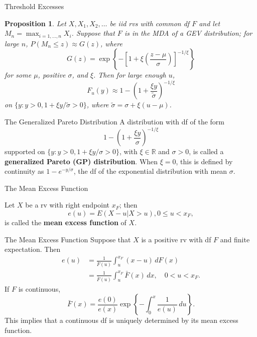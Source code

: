 \documentclass{beamer}
\newtheorem{proposition}{Proposition}
\begin{document}
\begin{frame}{Threshold Excesses}
    \begin{proposition} %
        Let $X, X_1, X_2, \ldots$ be iid rvs with common df $F$ and let $M_n = \max_{i = 1, \ldots, n} X_i$. Suppose that $F$ is in the MDA of a GEV distribution; for large $n$, $P(M_n \le z) \approx G(z)$, where
        \[
        G(z) = \exp\left\{-\left[1 + \xi\left(\frac{z - \mu}{\sigma}\right)\right]^{-1 / \xi}\right\}
        \]
        for some $\mu$, positive $\sigma$, and $\xi$. Then for large enough $u$,
        \[
        F_u(y) \approx 1 - \left(1 + \frac{\xi y}{\tilde{\sigma}}\right)^{-1 / \xi}
        \]
        on $\{y : y > 0, 1 + \xi y / \tilde{\sigma} > 0\}$, where $\tilde{\sigma} = \sigma + \xi(u - \mu)$.
    \end{proposition}
\end{frame}

\begin{frame}{The Generalized Pareto Distribution}
    A distribution with df of the form
    \[
    1 - \left(1 + \frac{\xi y}{\sigma}\right)^{-1 / \xi}
    \]
    supported on $\{y : y > 0, 1 + \xi y / \sigma > 0\}$, with $\xi \in \mathbb{R}$ and $\sigma > 0$, is called a \textbf{generalized Pareto (GP) distribution}. When $\xi = 0$, this is defined by continuity as $1 - e^{-y / \sigma}$, the df of the exponential distribution with mean $\sigma$.
\end{frame}

\begin{frame}{The Mean Excess Function}
    \begin{definition}
        Let $X$ be a rv with right endpoint $x_F$; then
        \[
        e(u) = E(X - u | X > u), 0 \le u < x_F,
        \]
        is called the \textbf{mean excess function} of $X$.
    \end{definition}
\end{frame}

\begin{frame}{The Mean Excess Function}
    Suppose that $X$ is a positive rv with df $F$ and finite expectation. Then
    \begin{align*}
        e(u) &= \frac{1}{\bar{F}(u)}\int_u^{x_F} (x - u)\,dF(x) \\
        &= \frac{1}{\bar{F}(u)}\int_u^{x_F} \bar{F}(x)\,dx, \quad 0 < u < x_F.
    \end{align*}
    If $F$ is continuous,
    \[
    \bar{F}(x) = \frac{e(0)}{e(x)}\exp\left\{-\int_0^x \frac{1}{e(u)}\,du\right\}.
    \]
    This implies that a continuous df is uniquely determined by its mean excess function.
\end{frame}
\end{document}
